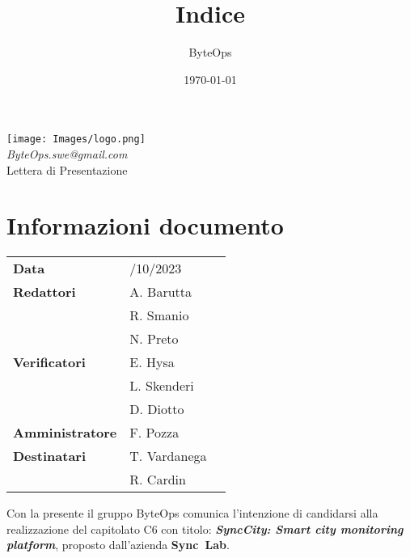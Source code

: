 \documentclass{article}
\title{\textbf{\fontsize{30}{6}\selectfont Indice}}
\author{\fontsize{14}{6}\selectfont ByteOps}
\date{\today}
\begin{document}
\pagestyle{fancy}
\begin{center}
\texttt{[image: Images/logo.png]} \\
\vspace{0.2cm}
\textcolor[RGB]{60, 60, 60}{\textit{ByteOps.swe@gmail.com}} \\
\vspace{1cm}
\fontsize{16}{6}\selectfont Lettera di Presentazione\\
\vspace{0.5cm}
\end{center}

\section*{Informazioni documento}
\def\arraystretch{1.2}
\begin{tabular}{>{\raggedleft\arraybackslash}p{}|>{\raggedright\arraybackslash}p{}c}
\hline
\addlinespace

    \textbf{Data} & 24/10/2023 \vspace{10pt} \\
    \textbf{Redattori} & A. Barutta \\ & R. Smanio \\ & N. Preto \vspace{10pt} \\
    \textbf{Verificatori} & E. Hysa \\ & L. Skenderi \\ & D. Diotto \vspace{10pt} \\
    \textbf{Amministratore} & F. Pozza \vspace{10pt} \\
    \textbf{Destinatari} & T. Vardanega \\ & R. Cardin \vspace{10pt} \\
\end{tabular}
\pagebreak 

\flushleft

Con la presente il gruppo ByteOps comunica l’intenzione di candidarsi alla realizzazione del capitolato C6 con titolo: \textbf{\textit{SyncCity: Smart city monitoring platform}}, proposto dall'azienda \mbox{\textbf{Sync Lab}}. 
\vspace{0.5cm}
\end{document}
